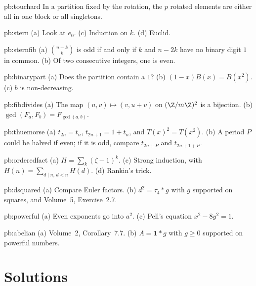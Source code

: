 \begin{hint}{pb:touchard}
In a partition fixed by the rotation, the $p$ rotated elements are either all in one block or all singletons.
\end{hint}

\begin{hint}{pb:stern}
(a) Look at $e_0$. (c) Induction on $k$. (d) Euclid.
\end{hint}

\begin{hint}{pb:sternfib}
(a) $\binom{n-k}k$ is odd if and only if $k$ and $n-2k$ have no binary digit $1$ in common. (b) Of two consecutive integers, one is
even.
\end{hint}

\begin{hint}{pb:binarypart}
(a) Does the partition contain a $1$? (b) $(1-x)B(x)=B(x^2)$. (c) $b$ is non-decreasing.
\end{hint}

\begin{hint}{pb:fibdivides}
(a) The map $(u,v)\mapsto(v,u+v)$ on $(\Z/m\Z)^2$ is a bijection. (b) $\gcd(F_a,F_b)=F_{\gcd(a,b)}$.
\end{hint}

\begin{hint}{pb:thuemorse}
(a) $t_{2n}=t_n$, $t_{2n+1}=1+t_n$, and $T(x)^2=T(x^2)$. (b) A period $P$ could be halved if even; if it is odd, compare
$t_{2n+P}$ and $t_{2n+1+P}$.
\end{hint}

\begin{hint}{pb:orderedfact}
(a) $H=\sum_k(\zeta-1)^k$. (c) Strong induction, with $H(n)=\sum_{d\mid n,\,d<n}H(d)$. (d) Rankin's trick.
\end{hint}

\begin{hint}{pb:dsquared}
(a) Compare Euler factors. (b) $d^2=\tau_4*g$ with $g$ supported on squares, and Volume~5, Exercise~2.7.
\end{hint}

\begin{hint}{pb:powerful}
(a) Even exponents go into $a^2$. (c) Pell's equation $x^2-8y^2=1$.
\end{hint}

\begin{hint}{pb:abelian}
(a) Volume~2, Corollary~7.7. (b) $A=\mathbf1*g$ with $g\ge0$ supported on powerful numbers.
\end{hint}

\section{Solutions}

